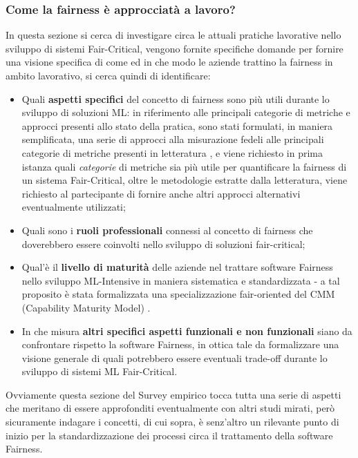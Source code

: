    
   \subsubsection{Come la fairness è approcciatà a lavoro?}
   
   In questa sezione si cerca di investigare circa le attuali pratiche lavorative nello sviluppo di sistemi Fair-Critical, vengono fornite specifiche domande per fornire una visione specifica di come ed in che modo le aziende trattino la fairness in ambito lavorativo, si cerca quindi di identificare:
   
   \begin{itemize}
       \item Quali \textbf{aspetti specifici} del concetto di fairness sono più utili durante lo sviluppo di soluzioni ML: in riferimento alle principali categorie di metriche e approcci presenti allo stato della pratica, sono stati formulati, in maniera semplificata, una serie di approcci alla misurazione fedeli alle principali categorie di metriche presenti in letteratura  \cite{FairnessDefinitionExplained}, e viene richiesto in prima istanza quali \emph{categorie} di metriche sia più utile per quantificare la fairness di un sistema Fair-Critical, oltre le metodologie estratte dalla letteratura, viene richiesto al partecipante di fornire anche altri approcci alternativi eventualmente utilizzati;
       \item Quali sono i \textbf{ruoli professionali} connessi al concetto di fairness che doverebbero essere coinvolti nello sviluppo di soluzioni fair-critical;
       \item Qual'è il \textbf{livello di maturità} delle aziende nel trattare software Fairness nello sviluppo ML-Intensive in maniera sistematica e standardizzata - a tal proposito è stata formalizzata una specializzazione fair-oriented del CMM (Capability Maturity Model) \cite{CMM}.
       \item In che misura \textbf{altri specifici aspetti funzionali e non funzionali} siano da confrontare rispetto la software Fairness, in ottica tale da formalizzare una visione generale di quali potrebbero essere eventuali trade-off durante lo sviluppo di sistemi ML Fair-Critical.
   \end{itemize}
   
   Ovviamente questa sezione del Survey empirico tocca tutta una serie di aspetti che meritano di essere approfonditi eventualmente con altri studi mirati, però sicuramente indagare i concetti, di cui sopra, è senz'altro un rilevante punto di inizio per la standardizzazione dei processi circa il trattamento della software Fairness. \\\\
   
